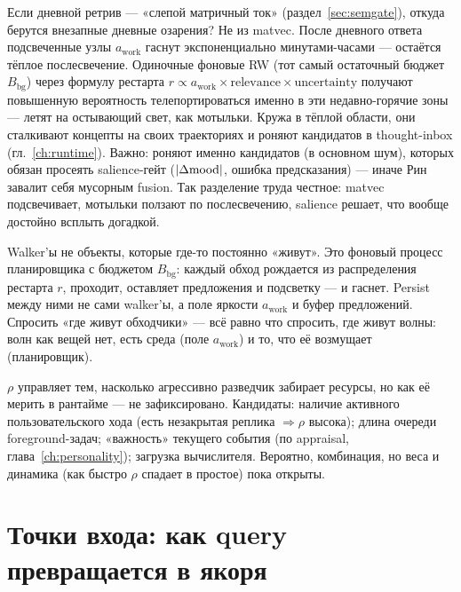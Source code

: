 \begin{intuition}
Если дневной ретрив --- «слепой матричный ток» (раздел~\ref{sec:semgate}),
откуда берутся внезапные дневные озарения? Не из matvec. После дневного ответа
подсвеченные узлы $a_{\text{work}}$ гаснут экспоненциально минутами-часами ---
остаётся тёплое послесвечение. Одиночные фоновые RW (тот самый остаточный
бюджет $B_{\text{bg}}$) через формулу рестарта
$r \propto a_{\text{work}} \times \mathrm{relevance} \times \mathrm{uncertainty}$
получают повышенную вероятность телепортироваться именно в эти недавно-горячие
зоны --- летят на остывающий свет, как мотыльки. Кружа в тёплой области, они
сталкивают концепты на своих траекториях и роняют кандидатов в thought-inbox
(гл.~\ref{ch:runtime}). Важно: роняют именно кандидатов (в основном шум),
которых обязан просеять salience-гейт ($|\Delta \mathrm{mood}|$, ошибка предсказания) ---
иначе Рин завалит себя мусорным fusion. Так разделение труда честное: matvec
подсвечивает, мотыльки ползают по послесвечению, salience решает, что вообще
достойно всплыть догадкой.
\end{intuition}

\begin{intuition}
Walker'ы не объекты, которые где-то постоянно «живут». Это фоновый процесс
планировщика с бюджетом $B_{\text{bg}}$: каждый обход рождается из
распределения рестарта $r$, проходит, оставляет предложения и подсветку --- и
гаснет. Persist между ними не сами walker'ы, а поле яркости $a_{\text{work}}$ и
буфер предложений. Спросить «где живут обходчики» --- всё равно что спросить,
где живут волны: волн как вещей нет, есть среда (поле $a_{\text{work}}$) и то,
что её возмущает (планировщик).
\end{intuition}

\begin{openq}
$\rho$ управляет тем, насколько агрессивно разведчик забирает ресурсы, но как
её мерить в рантайме --- не зафиксировано. Кандидаты: наличие активного
пользовательского хода (есть незакрытая реплика $\Rightarrow \rho$ высока);
длина очереди foreground-задач; «важность» текущего события (по appraisal,
глава~\ref{ch:personality}); загрузка вычислителя. Вероятно, комбинация, но
веса и динамика (как быстро $\rho$ спадает в простое) пока открыты.
\end{openq}

\section{Точки входа: как query превращается в якоря}
\label{sec:entrypoints}

